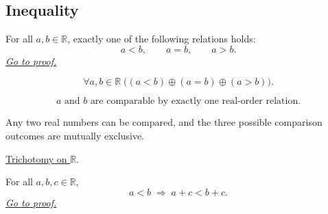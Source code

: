 
\subsection*{Inequality}
\label{sec:inequality}


\begin{theorem}
\label{thm:real-order-trichotomy}
For all $a,b\in\mathbb{R}$, exactly one of the following relations holds:
\[
a<b,\qquad a=b,\qquad a>b.
\]
\hyperref[prf:real-order-trichotomy]{\textit{Go to proof.}}
\end{theorem}

\begin{remark*}
\[
\forall a,b\in\mathbb{R}\;
\bigl((a<b)\oplus(a=b)\oplus(a>b)\bigr).
\]
\end{remark*}

\begin{remark*}
\[
a\text{ and }b\text{ are comparable by exactly one real-order relation.}
\]
\end{remark*}

\begin{remark*}[Interpretation]
Any two real numbers can be compared, and the three possible comparison
outcomes are mutually exclusive.
\end{remark*}

\begin{dependencies}
\hyperref[thm:trichotomy-on-r]{Trichotomy on $\mathbb{R}$}.
\end{dependencies}


\begin{theorem}
\label{thm:ineq-add-both-sides}
For all $a, b, c \in \mathbb{R}$,
\[
  a < b \;\Rightarrow\; a + c < b + c.
\]
\hyperref[prf:ineq-add-both-sides]{\textit{Go to proof.}}
\end{theorem}



